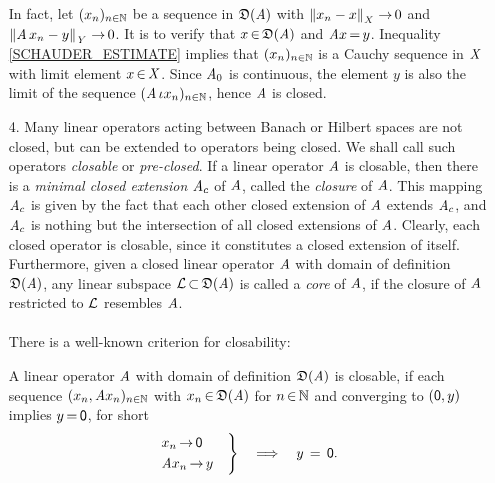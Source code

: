 \documentclass[11pt,twoside]{article}
\begin{document}
\begin{itemize}[leftmargin=12pt,itemsep=3pt]
\subparagraph{} %
In fact,
let $(x_n)_{n \in \N}$ be a sequence in $\domain{\linA}$
with $\norm{x_n-x}_{\banX} \xto 0$
and $\norm{\linA \,x_n-y}_{\banY} \xto 0$.
It is to verify that $x \xeof \domain{\linA}$ and $\linA x \eq y$.
Inequality \eqref{SCHAUDER_ESTIMATE} implies that
$(x_n)_{n \in \N}$ is a Cauchy sequence in $\banX$
with limit element $x \xeof \banX$.
Since $\linA_0$ is continuous,
the element $y$ is also the limit
of the sequence $(\linA \, \iota x_n)_{n \in \N}$,
hence $\linA$ is closed.

\item[4.] %
Many linear operators acting between Banach or Hilbert spaces are not closed,
but can be extended to operators being closed.
We shall call such operators \textit{closable} or \textit{pre-closed}.
If a linear operator $\linA$ is closable,
then there is a \textit{minimal closed extension} $\linA_c$ of $\linA$,
called the \textit{closure} of $\linA$.
This mapping $\linA_c$ is given by the fact
that each other closed extension of $\linA$ extends $\linA_c$,
and $\linA_c$ is nothing but the intersection
of all closed extensions of $\linA$.
Clearly,
each closed operator is closable,
since it constitutes a closed extension of itself.
Furthermore,
given a closed linear operator $\linA$
with domain of definition $\domain{\linA}$,
any linear subspace $\cal{L} \xsubset \domain{\linA}$
is called a \textit{core} of $\linA$,
if the closure of $\linA$ restricted to $\cal{L}$ resembles $\linA$.

\paragraph{} %
There is a well-known criterion for closability:

\begin{theorem}
A linear operator $\linA$ with domain of definition $\domain{\linA}$
is closable,
if each sequence $(x_n,\linA x_n)_{n \in \N}$
with $x_n \xeof \domain{\linA}$ for $n \xeof \N$ and converging to $(\0,y)$
implies $y \eq \0$,
for short
\[
\begin{rcases}
 x_n       \xto \0 \quad \\
 \linA x_n \xto  y \quad \\
\end{rcases}
\quad \Longrightarrow \quad
y \= \0.
\]
\end{theorem}


\end{itemize}
\end{document}
